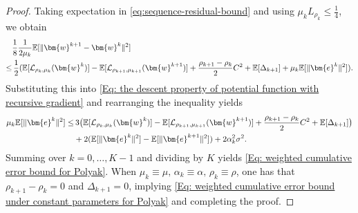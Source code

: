 \documentclass{article}
\theoremstyle{plain}
\theoremstyle{definition}
\theoremstyle{remark}
\newcommand{\EE}{\mathbb{E}}
\newcommand{\be}{\bm{e}}
\newcommand{\calL}{\mathcal{L}}
\newcommand{\bw}{\bm{w}}
\numberwithin{equation}{section}
\begin{document}
\begin{proof}
    Taking expectation in \eqref{eq:sequence-residual-bound} and using
    \(\mu_k L_{\rho_k}\leq \tfrac{1}{4}\), we obtain
    \begin{align}
        &\frac{1}{8}\frac{1}{2\mu_{k}}\EE[\| \bw^{k+1}- \bw^{k}\|^{2}] \notag \\
        \leq&\, \frac{1}{2}( \EE[\calL_{\rho_k, \mu_k}(\bw^{k})] - \EE[\calL_{\rho_{k+1}, \mu_{k+1}}(\bw^{k+1})] + \frac{\rho_{k+1}- \rho_{k}}{2}C^{2}+ \EE[\Delta_{k+1}]+ \mu_{k}\EE[\| \be^{k}\|^{2}] ). \notag
    \end{align}
Substituting this into \eqref{Eq: the descent property of potential function with recursive gradient}
    and rearranging the inequality yields
    \begin{align}
        \mu_{k}\EE [\| \be^{k}\|^{2}] \le &\, 3 \bigl( \EE[\calL_{\rho_k, \mu_k}(\bw^{k})] - \EE[\calL_{\rho_{k+1}, \mu_{k+1}}(\bw^{k+1})] + \frac{\rho_{k+1}- \rho_{k}}{2}C^{2} + \EE[\Delta_{k+1}] \bigr) \notag \\
        &+ 2( \EE [\| \be^{k}\|^{2}] - \EE [\| \be^{k+1}\|^{2}] ) + 2\alpha_{k}^{2}\sigma^{2}.
    \end{align}
Summing over $k = 0, \ldots, K-1$ and dividing by $K$ yields \eqref{Eq: weighted cumulative error bound for Polyak}.
    When $\mu_{k}\equiv \mu , \, \alpha_{k}\equiv \alpha ,\, \rho_{k}\equiv \rho$, one has that \(\rho_{k+1} - \rho_k = 0\) and \(\Delta_{k+1} = 0\), implying \eqref{Eq: weighted cumulative error bound under constant parameters for Polyak} and completing the proof.
\end{proof}
\end{document}
